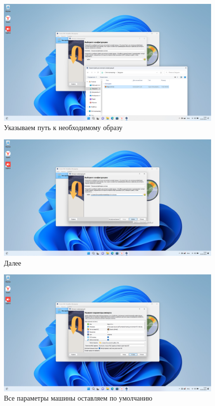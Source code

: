 \documentclass[a4paper]{article}
\begin{document}
  \begin{figure}[H]
    \centering
    \includegraphics[width=\textwidth]{Screenshot_4}
    \caption{Указываем путь к необходимому образу}
  \end{figure}

  \begin{figure}[H]
    \centering
    \includegraphics[width=\textwidth]{Screenshot_5}
    \caption{Далее}
  \end{figure}

  \begin{figure}[H]
    \centering
    \includegraphics[width=\textwidth]{Screenshot_6}
    \caption{Все параметры машины оставляем по умолчанию}
  \end{figure}
\end{document}

